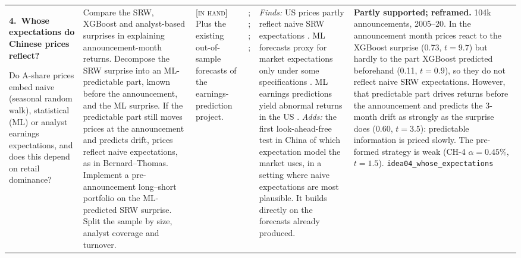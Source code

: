 \documentclass[10pt]{article}
\newcommand{\idea}[2]{\textbf{#1.\ #2}\par\smallskip}
\newcommand{\inhand}{\textsc{[in hand]}}
\begin{document}
{\begin{longtable}{@{}L{3.2cm}L{4.4cm}L{2.5cm}L{3.0cm}L{5.4cm}L{5.8cm}@{}}
\idea{4}{Whose expectations do Chinese prices reflect?}
Do A-share prices embed naive (seasonal random walk), statistical (ML) or analyst earnings expectations, and does
this depend on retail dominance?
&
Compare the SRW, XGBoost and analyst-based surprises in explaining announcement-month returns. Decompose the SRW
surprise into an ML-predictable part, known before the announcement, and the ML surprise. If the predictable part
still moves prices at the announcement and predicts drift, prices reflect naive expectations, as in Bernard--Thomas.
Implement a pre-announcement long--short portfolio on the ML-predicted SRW surprise. Split the sample by size,
analyst coverage and turnover.
&
\inhand{} Plus the existing out-of-sample forecasts of the earnings-prediction project.
&
\citet{bernard1990}; \citet{ball1996}; \citet{campbell2026}; \citet{hunt2022}; \citet{chen2022ml}
&
\emph{Finds:} US prices partly reflect naive SRW expectations \citep{bernard1990,ball1996}. ML forecasts proxy for
market expectations only under some specifications \citep{campbell2026}. ML earnings predictions yield abnormal
returns in the US \citep{hunt2022,chen2022ml}. \emph{Adds:} the first look-ahead-free test in China of which
expectation model the market uses, in a setting where naive expectations are most plausible. It builds directly on
the forecasts already produced.
&
\textbf{Partly supported; reframed.} 104k announcements, 2005--20. In the announcement month prices react to the XGBoost surprise (0.73, $t=9.7$) but hardly to the part XGBoost predicted beforehand (0.11, $t=0.9$), so they do not reflect naive SRW expectations. However, that predictable part drives returns before the announcement and predicts the 3-month drift as strongly as the surprise does (0.60, $t=3.5$): predictable information is priced slowly. The pre-formed strategy is weak (CH-4 $\alpha=0.45\%$, $t=1.5$). \texttt{idea04\_whose\_expectations}\\[4pt]


\end{longtable}}
\end{document}

